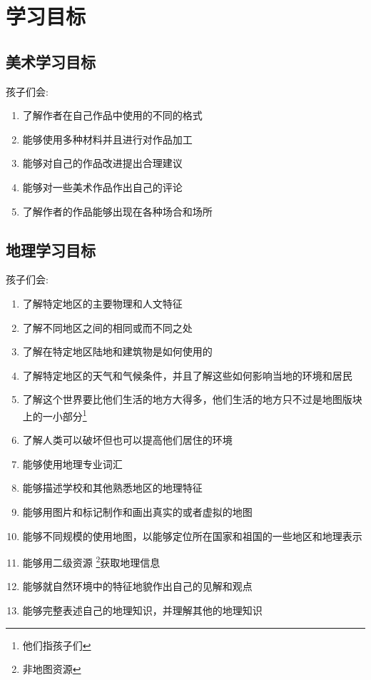 \chapter{学习目标}

\section{美术学习目标}
   孩子们会:
   \begin{enumerate}
     \item  了解作者在自己作品中使用的不同的格式
     \item  能够使用多种材料并且进行对作品加工
     \item  能够对自己的作品改进提出合理建议
     \item  能够对一些美术作品作出自己的评论
     \item  了解作者的作品能够出现在各种场合和场所
   \end{enumerate}


\section{地理学习目标}
   孩子们会:
   \begin{enumerate}
     \item  了解特定地区的主要物理和人文特征
     \item  了解不同地区之间的相同或而不同之处
     \item  了解在特定地区陆地和建筑物是如何使用的
     \item  了解特定地区的天气和气候条件，并且了解这些如何影响当地的环境和居民
     \item  了解这个世界要比他们生活的地方大得多，他们生活的地方只不过是地图版块上的一小部分{\color{red}\footnote{他们指孩子们}}
     \item  了解人类可以破坏但也可以提高他们居住的环境
     \item  能够使用地理专业词汇
     \item  能够描述学校和其他熟悉地区的地理特征
     \item  能够用图片和标记制作和画出真实的或者虚拟的地图
     \item  能够不同规模的使用地图，以能够定位所在国家和祖国的一些地区和地理表示
     \item  能够用二级资源{\color{red}  \footnote{非地图资源}}获取地理信息
     \item  能够就自然环境中的特征地貌作出自己的见解和观点
     \item  能够完整表述自己的地理知识，并理解其他的地理知识

   \end{enumerate}


